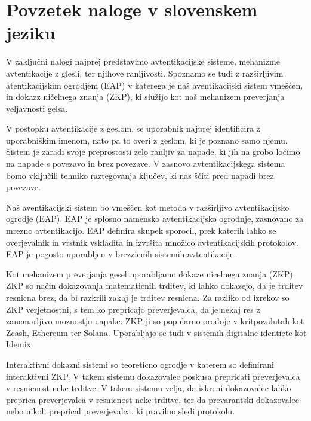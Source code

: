 \chapter{Povzetek naloge v slovenskem jeziku}
V zaključni nalogi najprej predstavimo avtentikacijske sisteme, mehanizme avtentikacije z glesli, ter njihove ranljivosti. Spoznamo se tudi z razširljivim atentikacijskim ogrodjem (EAP) v katerega je naš aventikacijski sistem vmeščen, in dokazz ničelnega znanja (ZKP), ki služijo kot naš mehanizem preverjanja veljavnosti gelsa.

V postopku avtentikacije z geslom, se uporabnik najprej identificira z uporabniškim imenom, nato pa to overi z geslom, ki je poznano samo njemu.
Sistem je zaradi svoje preprostosti zelo ranljiv za napade, ki jih na grobo ločimo na napade s povezavo in brez povezave. 
V zasnovo avtentikacijskega sistema bomo vključili tehniko raztegovanja ključev, ki nas ščiti pred napadi brez povezave.

Naš aventikacijski sistem bo vmeščen kot metoda v razširljivo avtentikacijsko ogrodje (EAP).
EAP je splosno namensko avtentikacijsko ogrodnje, zasnovano za mrezno avtentikacijo.
EAP definira skupek sporocil, prek katerih lahko se overjevalnik in vrstnik vskladita in izvršita množico avtentikacijskih protokolov.
EAP je pogosto uporabljen v brezzicnih sistemih avtentikacije.

Kot mehanizem preverjanja gesel uporabljamo dokaze nicelnega znanja (ZKP).
ZKP so način dokazovanja matematicnih trditev, ki lahko dokazejo, da je trditev resnicna brez, da bi razkrili zakaj je trditev resnicna.
Za razliko od izrekov so ZKP verjetnostni, s tem ko prepricajo preverjevalca, da je nekaj res z zanemarljivo moznostjo napake.
ZKP-ji so popularno orodoje v kritpovalutah kot Zcash, Ethereum ter Solana. Uporabljajo se tudi v sistemih digitalne identiete kot Idemix.

Interaktivni dokazni sistemi so teoreticno ogrodje v katerem so definirani interaktivni ZKP. V takem sistemu dokazovalec poskusa prepricati preverjevalca v resnicnost neke trditve.
V takem sistemu velja, da iskreni dokazovalec lahko preprica preverjevalca v resnicnost neke trditve, ter da prevarantski dokazovalec nebo nikoli preprical preverjevalca, ki pravilno sledi protokolu.

